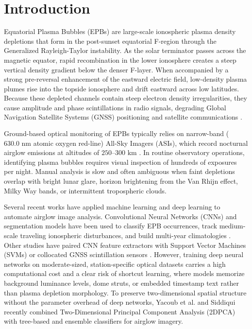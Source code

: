 \section{Introduction}\label{sec:introduction}

Equatorial Plasma Bubbles (EPBs) are large-scale ionospheric plasma density depletions that form in the post-sunset equatorial F-region through the Generalized Rayleigh-Taylor instability. As the solar terminator passes across the magnetic equator, rapid recombination in the lower ionosphere creates a steep vertical density gradient below the denser F-layer. When accompanied by a strong pre-reversal enhancement of the eastward electric field, low-density plasma plumes rise into the topside ionosphere and drift eastward across low latitudes. Because these depleted channels contain steep electron density irregularities, they cause amplitude and phase scintillations in radio signals, degrading Global Navigation Satellite Systems (GNSS) positioning and satellite communications \cite{zhong2025automatic,okoh2025bootstrapping,githio2024machine}.

Ground-based optical monitoring of EPBs typically relies on narrow-band ($630.0\text{ nm}$ atomic oxygen red-line) All-Sky Imagers (ASIs), which record nocturnal airglow emissions at altitudes of $250\text{--}300\text{ km}$ \cite{okoh2025bootstrapping,zhong2025automatic}. In routine observatory operations, identifying plasma bubbles requires visual inspection of hundreds of exposures per night. Manual analysis is slow and often ambiguous when faint depletions overlap with bright lunar glare, horizon brightening from the Van Rhijn effect, Milky Way bands, or intermittent tropospheric clouds.

Several recent works have applied machine learning and deep learning to automate airglow image analysis. Convolutional Neural Networks (CNNs) and segmentation models have been used to classify EPB occurrences, track medium-scale traveling ionospheric disturbances, and build multi-year climatologies \cite{srisamoodkham2022detecting,liu2022statistical,sedlak2023analysis,okoh2025bootstrapping,zhong2025automatic,zhong2025statistical}. Other studies have paired CNN feature extractors with Support Vector Machines (SVMs) or collocated GNSS scintillation sensors \cite{thanakulketsarat2023classification,thanakulketsarat2023equatorial,githio2024machine}. However, training deep neural networks on moderate-sized, station-specific optical datasets carries a high computational cost and a clear risk of shortcut learning, where models memorize background luminance levels, dome struts, or embedded timestamp text rather than plasma depletion morphology. To preserve two-dimensional spatial structure without the parameter overhead of deep networks, Yacoub et al. \cite{yacoub2025automatic} and Siddiqui \cite{siddiqui2025enhanced} recently combined Two-Dimensional Principal Component Analysis (2DPCA) \cite{yang2004two} with tree-based and ensemble classifiers for airglow imagery.


